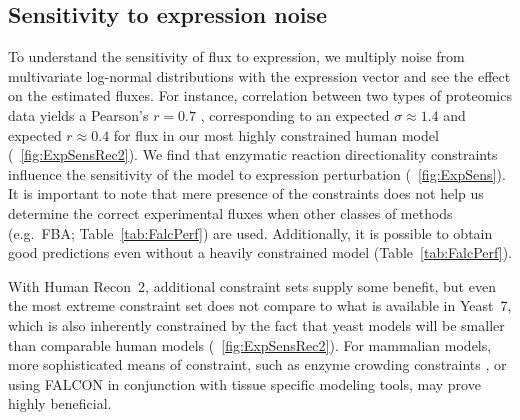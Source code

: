 \subsection{Sensitivity to expression noise}
\label{sec:sensToExpNoise}
To understand the sensitivity of flux to expression, we multiply noise
from multivariate log-normal distributions with the expression vector
and see the effect on the estimated fluxes. For instance, correlation
between two types of proteomics data yields a Pearson's $r = 0.7$
\citep{Gholami2013}, corresponding to an expected $\sigma \approx 1.4$
and expected $r \approx 0.4$ for flux in our most highly constrained
human model (\suppOrApp \Fig~\ref{fig:ExpSensRec2}). We find that
enzymatic reaction directionality constraints influence the
sensitivity of the model to expression perturbation
(\Fig~\ref{fig:ExpSens}). It is important to note that mere presence
of the constraints does not help us determine the correct experimental
fluxes when other classes of methods (e.g.\ FBA;
Table~\ref{tab:FalcPerf}) are used. Additionally, it is possible to
obtain good predictions even without a heavily constrained model
(Table~\ref{tab:FalcPerf}).

With Human Recon~2, additional constraint sets supply some benefit,
but even the most extreme constraint set does not compare to what is
available in Yeast~7, which is also inherently constrained by the fact
that yeast models will be smaller than comparable human models
(\suppOrApp \Fig~\ref{fig:ExpSensRec2}). For mammalian models, more
sophisticated means of constraint, such as enzyme crowding constraints
\citep{Shlomi2011}, or using FALCON in conjunction with tissue
specific modeling tools, may prove highly beneficial.

